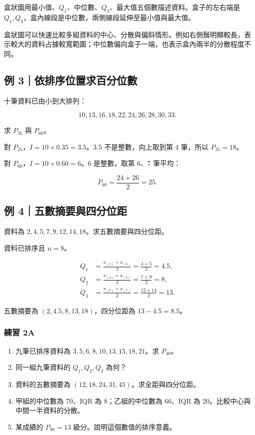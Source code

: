 \documentclass[11pt,a4paper]{article}
\providecommand{\tightlist}{%
  \setlength{\itemsep}{0pt}\setlength{\parskip}{0pt}}
\begin{document}
盒狀圖用最小值、\(Q_1\)、中位數、\(Q_3\)、最大值五個數描述資料。盒子的左右端是 \(Q_1,Q_3\)，盒內線段是中位數，兩側線段延伸至最小值與最大值。

盒狀圖可以快速比較多組資料的中心、分散與偏斜情形。例如右側鬚明顯較長，表示較大的資料占據較寬範圍；中位數偏向盒子一端，也表示盒內兩半的分散程度不同。

\subsection{例 3｜依排序位置求百分位數}\label{ux4f8b-3ux4f9dux6392ux5e8fux4f4dux7f6eux6c42ux767eux5206ux4f4dux6578}

十筆資料已由小到大排列：

\[
10,13,16,18,22,24,26,28,30,33.
\]

求 \(P_{35}\) 與 \(P_{60}\)。

對 \(P_{35}\)，\(I=10\times0.35=3.5\)。\(3.5\) 不是整數，向上取到第 4 筆，所以 \(\boxed{P_{35}=18}\)。

對 \(P_{60}\)，\(I=10\times0.60=6\)。\(6\) 是整數，取第 6、7 筆平均：

\[
P_{60}=\frac{24+26}{2}=\boxed{25}.
\]

\subsection{例 4｜五數摘要與四分位距}\label{ux4f8b-4ux4e94ux6578ux6458ux8981ux8207ux56dbux5206ux4f4dux8ddd}

資料為 \(2,4,5,7,9,12,14,18\)。求五數摘要與四分位距。

資料已排序且 \(n=8\)。

\[
\begin{aligned}
Q_1&=\frac{x_{(2)}+x_{(3)}}2=\frac{4+5}{2}=4.5,\\
Q_2&=\frac{x_{(4)}+x_{(5)}}2=\frac{7+9}{2}=8,\\
Q_3&=\frac{x_{(6)}+x_{(7)}}2=\frac{12+14}{2}=13.
\end{aligned}
\]

五數摘要為 \(\boxed{(2,4.5,8,13,18)}\)，四分位距為 \(13-4.5=\boxed{8.5}\)。

\subsubsection{練習 2A}\label{ux7df4ux7fd2-2a}

\begin{enumerate}
\def\labelenumi{\arabic{enumi}.}
\tightlist
\item
  九筆已排序資料為 \(3,5,6,8,10,13,15,18,21\)。求 \(P_{40}\)。
\item
  同一組九筆資料的 \(Q_1,Q_2,Q_3\) 為何？
\item
  資料的五數摘要為 \((12,18,24,31,45)\)。求全距與四分位距。
\item
  甲組的中位數為 70、IQR 為 8；乙組的中位數為 66、IQR 為 20。比較中心與中間一半資料的分散。
\item
  某成績的 \(P_{88}=13\) 級分。說明這個數值的排序意義。
\end{enumerate}
\end{document}
